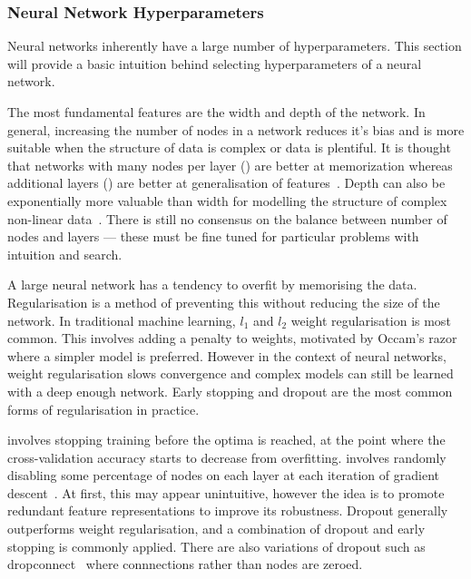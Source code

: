 \documentclass[12pt, twoside]{book}
\renewcommand\emph[1]{\textit{\color{USred}{#1}}}
\begin{document}
\subsubsection{Neural Network Hyperparameters}
Neural networks inherently have a large number of hyperparameters. This section will provide a basic intuition behind selecting hyperparameters of a neural network. 

The most fundamental features are the width and depth of the network. In general, increasing the number of nodes in a network reduces it's bias and is more suitable when the structure of data is complex or data is plentiful. It is thought that networks with many nodes per layer (\emph{width}) are better at memorization whereas additional layers (\emph{depth}) are better at generalisation of features~\cite{cheng2016wide}. Depth can also be exponentially more valuable than width for modelling the structure of complex non-linear data~\cite{eldan2016power}. There is still no consensus on the balance between number of nodes and layers --- these must be fine tuned for particular problems with intuition and search.

A large neural network has a tendency to overfit by memorising the data. Regularisation is a method of preventing this without reducing the size of the network. In traditional machine learning, $l_1$ and $l_2$ weight regularisation is most common. This involves adding a penalty to weights, motivated by Occam's razor where a simpler model is preferred. However in the context of neural networks, weight regularisation slows convergence and complex models can still be learned with a deep enough network. {Early stopping} and {dropout} are the most common forms of regularisation in practice. 

\emph{Early stopping} involves stopping training before the optima is reached, at the point where the cross-validation accuracy starts to decrease from overfitting. \emph{Dropout} involves randomly disabling some percentage of nodes on each layer at each iteration of gradient descent~\cite{dropout}. At first, this may appear unintuitive, however the idea is to promote redundant feature representations to improve its robustness. Dropout generally outperforms weight regularisation, and a combination of dropout and early stopping is commonly applied. There are also variations of dropout such as dropconnect~\cite{dropconnect} where connnections rather than nodes are zeroed.
\end{document}
